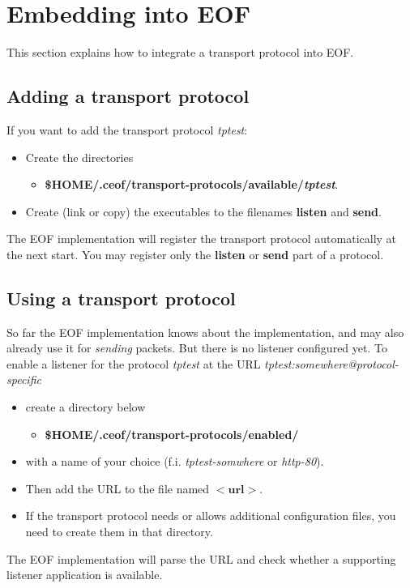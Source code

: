 \documentclass[12pt,a4paper]{book}
\begin{document}
\section{Embedding into EOF}
This section explains how to integrate a transport protocol into EOF.
\subsection{Adding a transport protocol}
If you want to add the transport protocol \emph{tptest}:
\begin{itemize}
\item Create the directories
\begin{itemize}
\item \textbf{\$HOME/.ceof/transport-protocols/available/\emph{tptest}}.
\end{itemize}
\item Create (link or copy) the executables to the filenames \textbf{listen}
and \textbf{send}.
\end{itemize}
The EOF implementation will register the transport protocol automatically
at the next start. You may register only the \textbf{listen} or
\textbf{send} part of a protocol.
\subsection{Using a transport protocol}
So far the EOF implementation knows about the implementation, and may also
already use it for \emph{sending} packets. But there is no listener configured
yet.
To enable a listener for the protocol \emph{tptest} at the URL
\emph{tptest:somewhere@protocol-specific}
\begin{itemize}
\item create a directory below
\begin{itemize}
\item \textbf{\$HOME/.ceof/transport-protocols/enabled/}
\end{itemize}
\item with a name of your choice (f.i. \emph{tptest-somwhere} or \emph{http-80}).
\item Then add the URL to the file named $<\textbf{url}>$.
\item If the transport protocol needs or allows additional configuration files,
you need to create them in that directory.
\end{itemize}
The EOF implementation will parse the URL and check whether a supporting
listener application is available.
\end{document}
